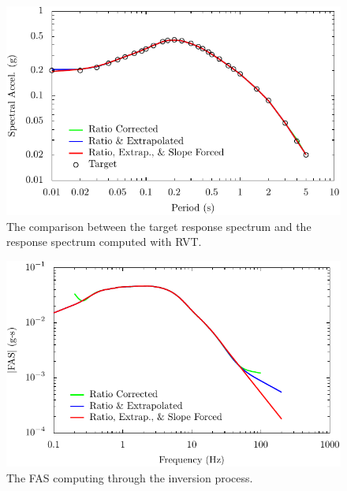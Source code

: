 \documentclass[11pt]{report}
\begin{document}
\begin{figure}[p]
  \begin{center}
	\includegraphics[width=0.95\linewidth]{figures/siteResponse/irvt-respSpec.pdf}
  \end{center}
  \caption{The comparison between the target response spectrum and the response spectrum computed with
  RVT.}
  \label{fig:irvt:sa}
\end{figure}
\begin{figure}[p]
  \begin{center}
	\includegraphics[width=0.95\linewidth]{figures/siteResponse/irvt-fas.pdf}
  \end{center}
  \caption{The FAS computing through the inversion process.}
  \label{fig:irvt:fas}
\end{figure}
\end{document}
